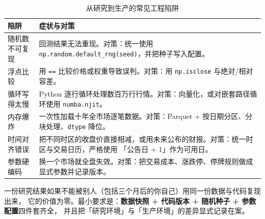 \begin{table}[htbp]
\centering
\caption{从研究到生产的常见工程陷阱}\label{tab:eng-pitfalls}
\tablefont
\begin{tabularx}{\textwidth}{@{}L{3.4cm}Y@{}}
\toprule
\textbf{陷阱} & \textbf{症状与对策} \\
\midrule
随机数不可复现 &
回测结果无法重现。对策：统一使用 \texttt{np.random.default\_rng(seed)}，并把种子写入配置。\\
浮点比较 &
用 \texttt{==} 比较价格或权重导致误判。对策：用 \texttt{np.isclose} 与绝对/相对容差。\\
循环写得太慢 &
Python 逐行循环处理数百万行行情。对策：向量化，或对嵌套路径循环使用 \texttt{numba.njit}。\\
内存爆炸 &
一次性加载十年全市场逐笔数据。对策：Parquet + 按日期分区、分块处理、\texttt{dtype} 降位。\\
时间对齐错误 &
把不同时区的收盘价直接相减，或用未来公布的财报。对策：统一时区与交易日历，严格使用
「公告日 + 1」作为可用日。\\
参数硬编码 &
换一个市场就全盘失效。对策：把交易成本、涨跌停、停牌规则做成显式参数并记录版本。\\
\bottomrule
\end{tabularx}
\end{table}

\begin{keybox}[可复现性是量化研究的第一生产力]
一份研究结果如果不能被别人（包括三个月后的你自己）用同一份数据与代码复现出来，
它的价值为零。最小要求是：\textbf{数据快照 + 代码版本 + 随机种子 + 参数配置}四件套齐全，
并且把「研究环境」与「生产环境」的差异显式记录在案。
\end{keybox}
